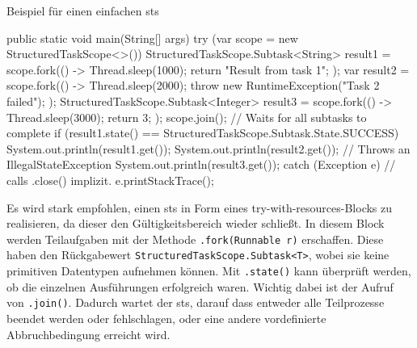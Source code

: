     \begin{program} [H]
        \caption{Beispiel für einen einfachen \gls{sts}}
        \label{prog:BeispielFürEinenEinfachenSts}
    \begin{JavaCode}[language=Java, numbers=left]
public static void main(String[] args) {
    try (var scope = new StructuredTaskScope<>()) {
        StructuredTaskScope.Subtask<String> result1 = scope.fork(() -> {
            Thread.sleep(1000);
            return "Result from task 1";
        });
        var result2 = scope.fork(() -> {
            Thread.sleep(2000);
            throw new RuntimeException("Task 2 failed");
        });
        StructuredTaskScope.Subtask<Integer> result3 = scope.fork(() -> {
            Thread.sleep(3000);
            return 3;
        });
        scope.join();                        // Waits for all subtasks to complete
        if (result1.state() == StructuredTaskScope.Subtask.State.SUCCESS){
            System.out.println(result1.get());  
        } 
        System.out.println(result2.get());   // Throws an IllegalStateException
        System.out.println(result3.get());
    } catch (Exception e) {                 // calls .close() implizit.
        e.printStackTrace();
    }
}\end{JavaCode}
    \end{program}
    Es wird stark empfohlen, einen \gls{sts} in Form eines try-with-resources-Blocks zu realisieren, da dieser den Gültigkeitsbereich wieder schließt. In diesem Block
    werden Teilaufgaben mit der Methode \texttt{.fork(Runnable r)} erschaffen. Diese haben den Rückgabewert \texttt{StructuredTaskScope.Subtask<T>}, wobei sie keine
    primitiven Datentypen aufnehmen können. Mit \texttt{.state()} kann überprüft werden, ob die einzelnen Ausführungen erfolgreich waren.
    Wichtig dabei ist der Aufruf von \texttt{.join()}. Dadurch wartet der \gls{sts}, darauf dass entweder alle Teilprozesse beendet werden oder fehlschlagen, oder
    eine andere vordefinierte Abbruchbedingung erreicht wird.
    \cite{oracle21STS}

